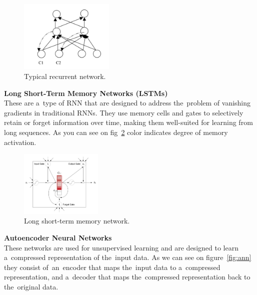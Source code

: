     \begin{center}
        \begin{figure}[!ht]
            \centering
            \includegraphics[width=0.4\textwidth]{figures/rn}
            \caption{Typical recurrent network. \cite{medsker2001recurrent}}
            \label{fig:rn}
        \end{figure}
    \end{center}
    \textbf{Long Short-Term Memory Networks (LSTMs)}\\
    These are a~type of RNN that are designed to address the~problem of vanishing gradients in traditional RNNs. They use memory cells and gates to selectively retain or forget information over time, making them well-suited for learning from long sequences. As you can see on fig~\ref{fig:ltmn} color indicates degree of memory activation.
    \begin{center}
        \begin{figure}[!ht]
            \centering
            \includegraphics[width=0.35\textwidth]{figures/ltmn}
            \caption{Long short-term memory network. \cite{cheng2016long}}
            \label{fig:ltmn}
        \end{figure}
    \end{center}
    \textbf{Autoencoder Neural Networks}\\
    These networks are used for unsupervised learning and are designed to learn a~compressed representation of the~input data. As we can see on figure~\ref{fig:ann} they consist of~an~encoder that maps the~input data to a~compressed representation, and a~decoder that maps the~compressed representation back to the~original data.
